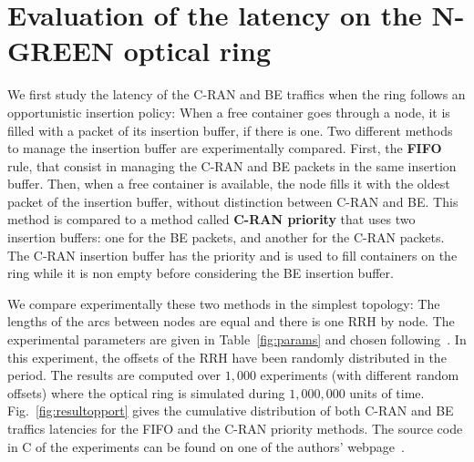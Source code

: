 \documentclass[10pt, conference, letterpaper]{IEEEtran}
\begin{document}
   \section{Evaluation of the latency on the N-GREEN optical ring}
   \label{sec:oportmethods}
   
   
  We first study the latency of the C-RAN and BE traffics when the ring follows an opportunistic insertion policy: When a free container goes through a node, it is filled with a packet of its insertion buffer, if there is one.
 Two different methods to manage the insertion buffer are experimentally compared. First, the \textbf{FIFO} rule, that consist in managing the C-RAN and BE packets in the same insertion buffer. Then, when a free container is available, the node fills it with the oldest packet of the insertion buffer, without distinction between C-RAN and BE. This method is compared to a method called \textbf{C-RAN priority} that uses two insertion buffers: one for the BE packets, and another for the C-RAN packets. The C-RAN insertion buffer has the priority and is used to fill containers on the ring while it is non empty before considering the BE insertion buffer.  
 
We compare experimentally these two methods in the simplest topology: The lengths of the arcs between nodes are equal and there is one RRH by node. The experimental parameters are given in Table~\ref{fig:params} and chosen following~\cite{ngreenarchitecture}. In this experiment, the offsets of the RRH have been randomly distributed in the period. The results are computed over $1,000$ experiments (with different random offsets) where the optical ring is simulated during $1,000,000$ units of time. Fig.~\ref{fig:resultopport} gives the cumulative distribution of both C-RAN and BE traffics latencies for the FIFO and the C-RAN priority methods. The source code in C of the experiments can be found on one of the authors' webpage~\cite{webpage}.
   \vspace{0.5cm}
  \hspace{-0.75cm}
\end{document}
